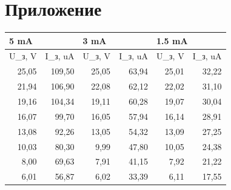 \documentclass[12pt, a4paper]{article}
\begin{document}
\section{Приложение}
\begin{table}[H]
\begin{tabular}{|rr|rr|rr|}
\hline
\multicolumn{2}{|l|}{5 mA}                                  & \multicolumn{2}{l|}{3 mA}                                  & \multicolumn{2}{l|}{1.5 mA}                                \\ \hline
\multicolumn{1}{|l|}{U_з, V} & \multicolumn{1}{l|}{I_з, uA} & \multicolumn{1}{l|}{U_з, V} & \multicolumn{1}{l|}{I_з, uA} & \multicolumn{1}{l|}{U_з, V} & \multicolumn{1}{l|}{I_з, uA} \\ \hline
\multicolumn{1}{|r|}{25,05}  & 109,50                       & \multicolumn{1}{r|}{25,05}  & 63,94                        & \multicolumn{1}{r|}{25,01}  & 32,22                        \\ \hline
\multicolumn{1}{|r|}{21,94}  & 106,90                       & \multicolumn{1}{r|}{22,08}  & 62,12                        & \multicolumn{1}{r|}{22,02}  & 31,10                        \\ \hline
\multicolumn{1}{|r|}{19,16}  & 104,34                       & \multicolumn{1}{r|}{19,11}  & 60,28                        & \multicolumn{1}{r|}{19,07}  & 30,04                        \\ \hline
\multicolumn{1}{|r|}{16,07}  & 99,70                        & \multicolumn{1}{r|}{16,05}  & 57,94                        & \multicolumn{1}{r|}{16,14}  & 28,91                        \\ \hline
\multicolumn{1}{|r|}{13,08}  & 92,26                        & \multicolumn{1}{r|}{13,05}  & 54,32                        & \multicolumn{1}{r|}{13,09}  & 27,25                        \\ \hline
\multicolumn{1}{|r|}{10,03}  & 80,30                        & \multicolumn{1}{r|}{9,99}   & 47,80                        & \multicolumn{1}{r|}{10,05}  & 24,38                        \\ \hline
\multicolumn{1}{|r|}{8,00}   & 69,63                        & \multicolumn{1}{r|}{7,91}   & 41,15                        & \multicolumn{1}{r|}{7,92}   & 21,22                        \\ \hline
\multicolumn{1}{|r|}{6,01}   & 56,87                        & \multicolumn{1}{r|}{6,02}   & 33,39                        & \multicolumn{1}{r|}{6,11}   & 17,55                        \\ \hline

\end{tabular}
\end{table}
\end{document}
